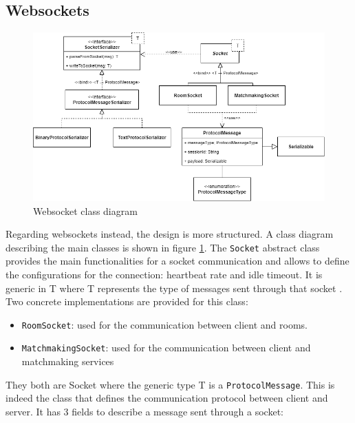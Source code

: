 \subsection{Websockets}
\begin{figure}[h]
	\hspace*{-0.5in}
	\includegraphics[scale=0.6]{images/4-design/communication_protocol.png}
	\caption{Websocket class diagram}
	\label{fig:websocket_communication_design}
\end{figure}
Regarding websockets instead, the design is more structured. A class diagram describing the main classes is shown in figure \ref{fig:websocket_communication_design}.
The \texttt{Socket} abstract class provides the main functionalities for a socket communication and allows to define the configurations for the connection: heartbeat rate and idle timeout. It is generic in T where T represents the type of messages sent through that socket . Two concrete implementations are provided for this class:
\begin{itemize}
	\item \texttt{RoomSocket}: used for the communication between client and rooms.
	\item \texttt{MatchmakingSocket}: used for the communication between client and matchmaking services
\end{itemize}
They both are Socket where the generic type T is a \texttt{ProtocolMessage}. This is indeed the class that defines the communication protocol between client and server. It has 3 fields to describe a message sent through a socket:
